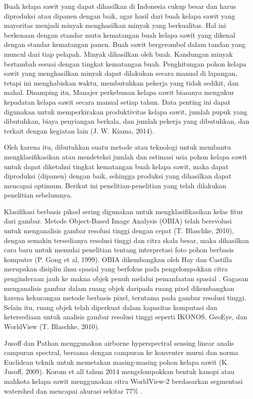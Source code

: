 Buah kelapa sawit yang dapat dihasilkan di Indonesia cukup besar dan harus diproduksi atau dipanen dengan baik, agar hasil dari buah kelapa sawit yang mayoritas menjadi minyak menghasilkan minyak yang berkualitas. Hal ini berkenaan dengan standar mutu kematangan buah kelapa sawit yang dikenal dengan standar kematangan panen. Buah sawit bergerombol dalam tandan yang muncul dari tiap pelapah. Minyak dihasilkan oleh buah. Kandungan minyak bertambah sesuai dengan tingkat kematangan buah. Penghitungan pohon kelapa sawit yang menghasilkan minyak dapat dilakukan secara manual di lapangan, tetapi ini menghabiskan waktu, membutuhkan pekerja yang tidak sedikit, dan mahal\citep{Mubin2019-xq}. Disamping itu, Manajer perkebunan kelapa sawit biasanya mengukur kepadatan kelapa sawit secara manual setiap tahun. Data penting ini dapat digunakan untuk memperkirakan produktivitas kelapa sawit, jumlah pupuk yang dibutuhkan, biaya penyiangan berkala, dan jumlah pekerja yang dibutuhkan, dan terkait dengan kegiatan lain (J. W. Kiama, 2014).

Oleh karena itu, dibutuhkan suatu metode atau teknologi untuk membantu mengklasifikasikan atau mendeteksi jumlah dan estimasi usia pohon kelapa sawit untuk dapat diketahui tingkat kematangan buah kelapa sawit, maka dapat diproduksi (dipanen) dengan baik, sehingga produksi yang dihasilkan dapat mencapai optimum. Berikut ini penelitian-penelitian yang telah dilakukan penelitian sebelumnya.

Klasifikasi berbasis piksel sering digunakan untuk mengklasifikasikan kelas fitur dari gambar. Metode Object-Based Image Analysis (OBIA) telah berevolusi untuk menganalisis gambar resolusi tinggi dengan cepat (T. Blaschke, 2010), dengan semakin tersedianya resolusi tinggi dan citra skala besar, maka dihasilkan cara baru untuk memulai penelitian tentang interpretasi foto pohon berbasis komputer (P. Gong et al, 1999). OBIA dikembangkan oleh Hay dan Castilla merupakan disiplin ilmu spasial yang berfokus pada pengelompokkan citra penginderaan jauh ke makna objek penuh melalui pemanfaatan spasial \citep{Hay2008-vt}. Gagasan menganalisis gambar dalam ruang objek daripada ruang pixel dikembangkan karena kekurangan metode berbasis pixel, terutama pada gambar resolusi tinggi. Selain itu, ruang objek telah diperkuat dalam kapasitas komputasi dan ketersediaan untuk analisis gambar resolusi tinggi seperti IKONOS, GeoEye, dan WorldView (T. Blaschke, 2010).

Jusoff dan Pathan menggunakan airborne hyperspectral sensing linear analis campuran spectral, bersama dengan campuran ke konventer murni dan norma Euclidean teknik untuk memetakan masing-masing pohon kelapa sawit (K. Jusoff, 2009). Korom et all tahun 2014 mengelompokkan bentuk kanopi atau mahkota kelapa sawit menggunakan citra WorldView-2 berdasarkan segmentasi watershed dan mencapai akurasi sekitar 77\% \citep{Korom2014-ci}.

